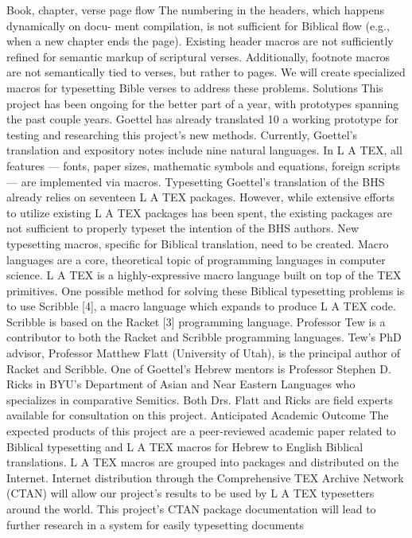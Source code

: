 \documentclass{acm_proc_article-sp}
\begin{document}
Book, chapter, verse page flow The numbering in the headers, which happens dynamically on docu-
ment compilation, is not sufficient for Biblical flow (e.g., when a new chapter ends the page). Existing header
macros are not sufficiently refined for semantic markup of scriptural verses. Additionally, footnote macros
are not semantically tied to verses, but rather to pages. We will create specialized macros for typesetting
Bible verses to address these problems.
Solutions This project has been ongoing for the better part of a year, with prototypes spanning the
past couple years. Goettel has already translated 10%
a working prototype for testing and researching this project’s new methods. Currently, Goettel’s translation
and expository notes include nine natural languages.
In L A TEX, all features — fonts, paper sizes, mathematic symbols and equations, foreign scripts — are
implemented via macros. Typesetting Goettel’s translation of the BHS already relies on seventeen L A TEX
packages. However, while extensive efforts to utilize existing L A TEX packages has been spent, the existing
packages are not sufficient to properly typeset the intention of the BHS authors. New typesetting macros,
specific for Biblical translation, need to be created.
Macro languages are a core, theoretical topic of programming languages in computer science. L A TEX is a
highly-expressive macro language built on top of the TEX primitives. One possible method for solving these
Biblical typesetting problems is to use Scribble [4], a macro language which expands to produce L A TEX code.
Scribble is based on the Racket [3] programming language. Professor Tew is a contributor to both the Racket
and Scribble programming languages. Tew’s PhD advisor, Professor Matthew Flatt (University of Utah), is
the principal author of Racket and Scribble. One of Goettel’s Hebrew mentors is Professor Stephen D. Ricks
in BYU’s Department of Asian and Near Eastern Languages who specializes in comparative Semitics. Both
Drs. Flatt and Ricks are field experts available for consultation on this project.
Anticipated Academic Outcome
The expected products of this project are a peer-reviewed academic paper related to Biblical typesetting
and L A TEX macros for Hebrew to English Biblical translations. L A TEX macros are grouped into packages
and distributed on the Internet. Internet distribution through the Comprehensive TEX Archive Network
(CTAN) will allow our project’s results to be used by L A TEX typesetters around the world. This project’s
CTAN package documentation will lead to further research in a system for easily typesetting documents
\end{document}
